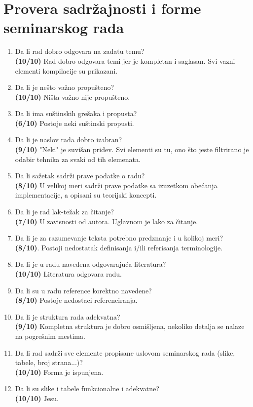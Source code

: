 \documentclass[a4paper]{report}
\begin{document}
\section{Provera sadržajnosti i forme seminarskog rada}

\begin{enumerate}
\item Da li rad dobro odgovara na zadatu temu?\\
\textbf{(10/10)} Rad dobro odgovara temi jer je kompletan i saglasan. Svi vazni elementi kompilacije su prikazani.
\item Da li je nešto važno propušteno?\\
\textbf{(10/10)} Ništa važno nije propušteno.
\item Da li ima suštinskih grešaka i propusta?\\
\textbf{(6/10)} Postoje neki suštinski propusti.
\item Da li je naslov rada dobro izabran?\\
\textbf{(9/10)} "Neki" je suvišan pridev. Svi elementi su tu, ono što jeste filtrirano je odabir tehnika za svaki od tih elemenata.
\item Da li sažetak sadrži prave podatke o radu?\\
\textbf{(8/10)} U velikoj meri sadrži prave podatke sa izuzetkom obećanja implementacije, a opisani su teorijski koncepti.
\item Da li je rad lak-težak za čitanje?\\
\textbf{(7/10)} U zavisnosti od autora. Uglavnom je lako za čitanje.
\item Da li je za razumevanje teksta potrebno predznanje i u kolikoj meri?\\
\textbf{(8/10)}. Postoji nedostatak definisanja i/ili referisanja terminologije.
\item Da li je u radu navedena odgovarajuća literatura?\\
\textbf{(10/10)} Literatura odgovara radu.
\item Da li su u radu reference korektno navedene?\\
\textbf{(8/10)} Postoje nedostaci referenciranja.
\item Da li je struktura rada adekvatna?\\
\textbf{(9/10)} Kompletna struktura je dobro osmišljena, nekoliko detalja se nalaze na pogrešnim mestima.
\item Da li rad sadrži sve elemente propisane uslovom seminarskog rada (slike, tabele, broj strana...)?\\
\textbf{(10/10)} Forma je ispunjena.
\item Da li su slike i tabele funkcionalne i adekvatne?\\
\textbf{(10/10)} Jesu.
\end{enumerate}
\end{document}
